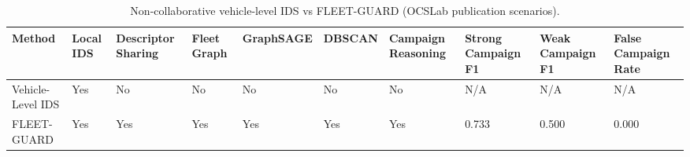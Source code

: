 \begin{table}[t]
\centering
\caption{Non-collaborative vehicle-level IDS vs FLEET-GUARD (OCSLab publication scenarios).}
\label{tab:non_collab_vs_fleet_guard}
\begin{tabular}{llllllllll}
\toprule
Method & Local IDS & Descriptor Sharing & Fleet Graph & GraphSAGE & DBSCAN & Campaign Reasoning & Strong Campaign F1 & Weak Campaign F1 & False Campaign Rate \\
\midrule
Vehicle-Level IDS & Yes & No & No & No & No & No & N/A & N/A & N/A \\
FLEET-GUARD & Yes & Yes & Yes & Yes & Yes & Yes & 0.733 & 0.500 & 0.000 \\
\bottomrule
\end{tabular}

\end{table}
